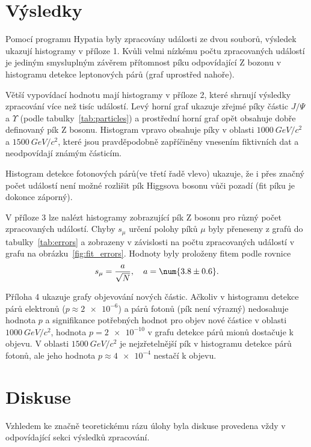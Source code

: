 \documentclass{scirep}
\begin{document}
    \section*{Výsledky}

    Pomocí programu Hypatia byly zpracovány události ze dvou souborů, výsledek ukazují histogramy v příloze 1.
    Kvůli velmi nízkému počtu zpracovaných událostí je jediným smysluplným závěrem přítomnost píku odpovídající Z bozonu v histogramu detekce leptonových párů (graf uprostřed nahoře).

    Větší vypovídací hodnotu mají histogramy v příloze 2, které shrnují výsledky zpracování více než tisíc událostí.
    Levý horní graf ukazuje zřejmé píky částic $J / \Psi$ a $\Upsilon$ (podle tabulky~\ref{tab:particles}) a prostřední horní graf opět obsahuje dobře definovaný pík Z bosonu.
    Histogram vpravo obsahuje píky v oblasti $\SI{1000}{GeV/c^2}$ a $\SI{1500}{GeV/c^2}$, které jsou pravděpodobně zapříčiněny vnesením fiktivních dat a neodpovídají známým částicím.

    Histogram detekce fotonových párů(ve třetí řadě vlevo) ukazuje, že i přes značný počet událostí není možné rozlišit pík Higgsova bosonu vůči pozadí (fit píku je dokonce záporný).

    V příloze 3 lze nalézt histogramy zobrazující pík Z bosonu pro různý počet zpracovaných událostí.
    Chyby $s_{\mu}$ určení polohy píků $\mu$ byly přeneseny z grafů do tabulky~\ref{tab:errors} a zobrazeny v závislosti na počtu zpracovaných událostí v grafu na obrázku~\ref{fig:fit_errors}.
    Hodnoty byly proloženy fitem podle rovnice
    \[ s_{\mu} = \frac{a}{\sqrt{N}},~~~ a = \num{3.8 \pm 0.6}. \]


    Příloha 4 ukazuje grafy objevování nových částic.
    Ačkoliv v histogramu detekce párů elektronů ($p \approx \num{2e-6}$) a párů fotonů (pík není výrazný) nedosahuje hodnota $p$ a signifikance potřebných hodnot pro objev nové částice v oblasti $\SI{1000}{GeV/c^2}$, hodnota $p = \num{2e-10}$ v grafu detekce párů mionů dostačuje k objevu.
    V oblasti $\SI{1500}{GeV/c^2}$ je nejzřetelnější pík v histogramu detekce párů fotonů, ale jeho hodnota $p \approx \num{4e-4}$ nestačí k objevu.


    \section*{Diskuse}
    Vzhledem ke značně teoretickému rázu úlohy byla diskuse provedena vždy v odpovídající sekci výsledků zpracování.
\end{document}

